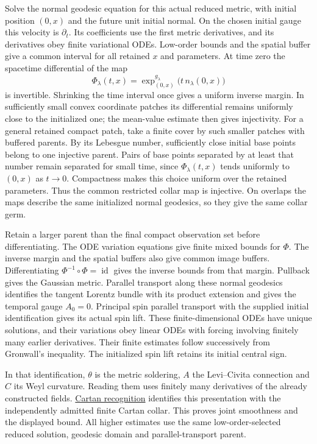 \documentclass[
  english,
  11pt,
  reqno]{amsart}
\begin{document}
Solve the normal geodesic equation for this actual reduced metric, with
initial position \((0,x)\) and the future unit initial normal. On the
chosen initial gauge this velocity is \(\partial_t\). Its coefficients
use the first metric derivatives, and its derivatives obey finite
variational ODEs. Low-order bounds and the spatial buffer give a common
interval for all retained \(x\) and parameters. At time zero the
spacetime differential of the map%
 \[
\Phi_\lambda(t,x)=
\exp^{g_\lambda}_{(0,x)}
\bigl(t\,n_\lambda(0,x)\bigr)
\] is invertible. Shrinking the time interval once gives a uniform
inverse margin. In sufficiently small convex coordinate patches its
differential remains uniformly close to the initialized one; the
mean-value estimate then gives injectivity. For a general retained
compact patch, take a finite cover by such smaller patches with buffered
parents. By its Lebesgue number, sufficiently close initial base points
belong to one injective parent. Pairs of base points separated by at
least that number remain separated for small time, since
\(\Phi_\lambda(t,x)\) tends uniformly to \((0,x)\) as \(t\to0\).
Compactness makes this choice uniform over the retained parameters. Thus
the common restricted collar map is injective. On overlaps the maps
describe the same initialized normal geodesics, so they give the same
collar germ.

Retain a larger parent than the final compact observation set before
differentiating. The ODE variation equations give finite mixed bounds
for \(\Phi\). The inverse margin and the spatial buffers also give
common image buffers. Differentiating
\(\Phi^{-1}\circ\Phi=\operatorname{id}\) gives the inverse bounds from
that margin. Pullback gives the Gaussian metric. Parallel transport
along these normal geodesics identifies the tangent Lorentz bundle with
its product extension and gives the temporal gauge \(A_0=0\). Principal
spin parallel transport with the supplied initial identification gives
its actual spin lift. These finite-dimensional ODEs have unique
solutions, and their variations obey linear ODEs with forcing involving
finitely many earlier derivatives. Their finite estimates follow
successively from Gronwall's inequality. The initialized spin lift
retains its initial central sign.

In that identification, \(\theta\) is the metric soldering, \(A\) the
Levi--Civita connection and \(C\) its Weyl curvature. Reading them uses
finitely many derivatives of the already constructed fields.
\hyperref[thm:online-cartan-collar-recognition]{Cartan recognition}
identifies this presentation with the independently admitted finite
Cartan collar. This proves joint smoothness and the displayed bound. All
higher estimates use the same low-order-selected reduced solution,
geodesic domain and parallel-transport parent.
\end{document}
